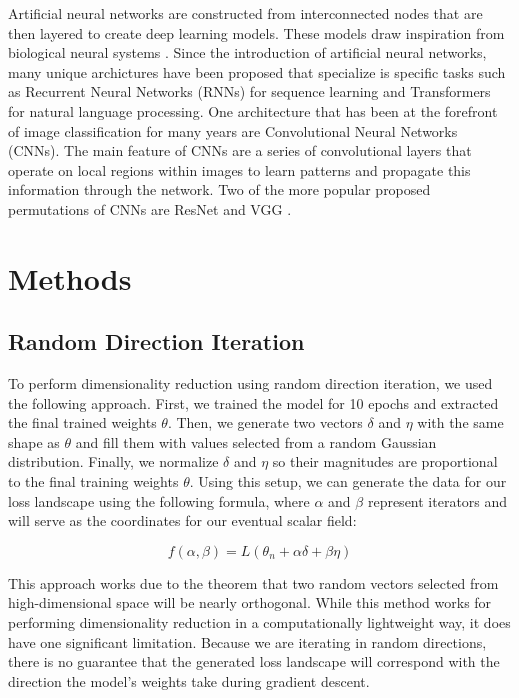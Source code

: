 \documentclass{acmsiggraph}
\begin{document}
Artificial neural networks are constructed from interconnected nodes that are then layered to create deep learning models. These models draw inspiration from biological neural systems \cite{https://doi.org/10.48550/arxiv.1511.08458}. Since the introduction of artificial neural networks, many unique archictures have been proposed that specialize is specific tasks such as Recurrent Neural Networks (RNNs) for sequence learning and Transformers for natural language processing. One architecture that has been at the forefront of image classification for many years are Convolutional Neural Networks (CNNs). The main feature of CNNs are a series of convolutional layers that operate on local regions within images to learn patterns and propagate this information through the network. Two of the more popular proposed permutations of CNNs are ResNet and VGG \cite{https://doi.org/10.48550/arxiv.1512.03385}. 

\section{Methods}
\label{sec:intro}
\subsection{Random Direction Iteration}
To perform dimensionality reduction using random direction iteration, we used the following approach. First, we trained the model for 10 epochs and extracted the final trained weights $\theta$. Then, we generate two vectors $\delta$ and $\eta$ with the same shape as $\theta$ and fill them with values selected from a random Gaussian distribution. Finally, we normalize $\delta$ and $\eta$ so their magnitudes are proportional to the final training weights $\theta$. Using this setup, we can generate the data for our loss landscape using the following formula, where $\alpha$ and $\beta$ represent iterators and will serve as the coordinates for our eventual scalar field:

\begin{equation} \label{eq1}
f(\alpha, \beta) = L(\theta_n + \alpha\delta + \beta\eta) 
\end{equation}

This approach works due to the theorem that two random vectors selected from high-dimensional space will be nearly orthogonal. While this method works for performing dimensionality reduction in a computationally lightweight way, it does have one significant limitation. Because we are iterating in random directions, there is no guarantee that the generated loss landscape will correspond with the direction the model's weights take during gradient descent. 
\end{document}
